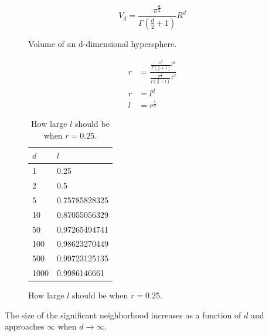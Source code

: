 \documentclass[12pt]{article}
\begin{document}
\begin{enumerate}
  \begin{figure}[H]
    \begin{equation}
      V_d = \frac{\pi^\frac{d}{2}}{\Gamma(\frac{d}{2}+1)}R^d
    \end{equation}
    \caption{Volume of an d-dimensional hypersphere.}
  \end{figure}
  \begin{figure}[H]
    \begin{equation}
    \begin{split}
      r& = \frac{\frac{\pi^\frac{d}{2}}{\Gamma(\frac{d}{2}+1)}l^d}{\frac{\pi^\frac{d}{2}}{\Gamma(\frac{d}{2}+1)}1^d} \\
      r& = l^d \\
      l& = r^\frac{1}{d}
    \end{split}
    \end{equation}
    \caption{The significant neighborhood $l$ of a point $x$.}
  \begin{table}[H]
    \centering
    \begin{tabular}{ll}
      $d$ & $l$ \\ \hline
      1 & 0.25 \\
      2 & 0.5 \\
      5 & 0.75785828325 \\
      10 & 0.87055056329 \\
      50 & 0.97265494741 \\
      100 & 0.98623270449 \\
      500 & 0.99723125135 \\
      1000 & 0.9986146661 \\
    \end{tabular}
    \caption{How large $l$ should be when $r=0.25$.}
    \end{table}
  \end{figure}
  The size of the significant neighborhood increases as a function of $d$ and approaches $\infty$ when $d \rightarrow \infty$.
\end{enumerate}
\end{document}
